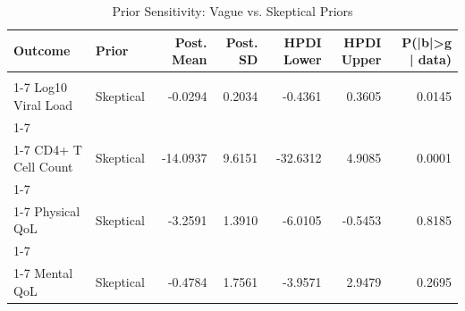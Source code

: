 \begin{table}[!h]
\centering
\caption{\label{tab:prior-sensitivity}Prior Sensitivity: Vague vs. Skeptical Priors}
\centering
\begin{tabular}[t]{llrrrrr}
\toprule
Outcome & Prior & Post. Mean & Post. SD & HPDI Lower & HPDI Upper & P(|b|>g | data)\\
\midrule
\cellcolor{gray!10}{Log10 Viral Load} & \cellcolor{gray!10}{Vague} & \cellcolor{gray!10}{-0.0292} & \cellcolor{gray!10}{0.2021} & \cellcolor{gray!10}{-0.4240} & \cellcolor{gray!10}{0.3698} & \cellcolor{gray!10}{0.0142}\\
\cmidrule{1-7}
Log10 Viral Load & Skeptical & -0.0294 & 0.2034 & -0.4361 & 0.3605 & 0.0145\\
\cmidrule{1-7}
\cellcolor{gray!10}{CD4+ T Cell Count} & \cellcolor{gray!10}{Vague} & \cellcolor{gray!10}{-148.5597} & \cellcolor{gray!10}{30.4498} & \cellcolor{gray!10}{-208.0764} & \cellcolor{gray!10}{-88.9637} & \cellcolor{gray!10}{0.9993}\\
\cmidrule{1-7}
CD4+ T Cell Count & Skeptical & -14.0937 & 9.6151 & -32.6312 & 4.9085 & 0.0001\\
\cmidrule{1-7}
\cellcolor{gray!10}{Physical QoL} & \cellcolor{gray!10}{Vague} & \cellcolor{gray!10}{-3.3212} & \cellcolor{gray!10}{1.3998} & \cellcolor{gray!10}{-6.1056} & \cellcolor{gray!10}{-0.6037} & \cellcolor{gray!10}{0.8273}\\
\cmidrule{1-7}
Physical QoL & Skeptical & -3.2591 & 1.3910 & -6.0105 & -0.5453 & 0.8185\\
\cmidrule{1-7}
\cellcolor{gray!10}{Mental QoL} & \cellcolor{gray!10}{Vague} & \cellcolor{gray!10}{-0.4917} & \cellcolor{gray!10}{1.7717} & \cellcolor{gray!10}{-3.9648} & \cellcolor{gray!10}{2.9701} & \cellcolor{gray!10}{0.2766}\\
\cmidrule{1-7}
Mental QoL & Skeptical & -0.4784 & 1.7561 & -3.9571 & 2.9479 & 0.2695\\
\bottomrule
\end{tabular}
\end{table}
